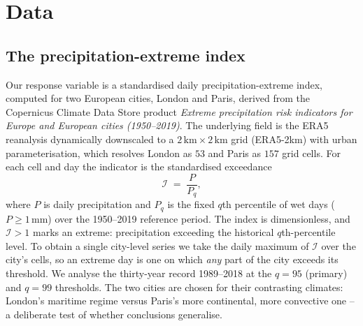 \documentclass[11pt,a4paper]{article}
\newcommand{\Ind}{\mathcal{I}}                 %
\begin{document}
\section{Data}\label{sec:data}

\subsection{The precipitation-extreme index}\label{sec:data-index}
Our response variable is a standardised daily precipitation-extreme index,
computed for two European cities, {London} and {Paris},
derived from the Copernicus Climate Data Store product \emph{Extreme precipitation
risk indicators for Europe and European cities (1950--2019)}. The underlying field
is the ERA5 reanalysis dynamically downscaled to a
$2\,\mathrm{km}\times2\,\mathrm{km}$ grid (ERA5-2km) with urban parameterisation,
which resolves London as $53$ and Paris as $157$ grid cells. For each cell and day
the indicator is the standardised exceedance
\begin{equation}\label{eq:index-def}
\Ind \;=\; \frac{P}{P_q},
\end{equation}
where $P$ is daily precipitation and $P_q$ is the fixed $q$th percentile of wet
days ($P\ge 1\,\mathrm{mm}$) over the 1950--2019 reference period. The index is
dimensionless, and $\Ind>1$ marks an extreme: precipitation exceeding the
historical $q$th-percentile level. To obtain a single city-level series we take the
daily maximum of $\Ind$ over the city's cells, so an extreme day is one on which
\emph{any} part of the city exceeds its threshold. We analyse the thirty-year
record 1989--2018 at the $q=95$ (primary) and $q=99$ thresholds. The two cities
are chosen for their contrasting climates: London's maritime regime versus Paris's
more continental, more convective one -- a deliberate test of whether conclusions
generalise.
\end{document}
